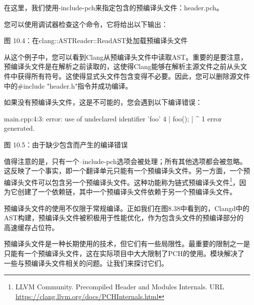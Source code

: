 在这里，我们使用-include-pch来指定包含的预编译头文件：header.pch。

您可以使用调试器检查这个命令，它将给出以下输出：


\begin{center}
图 10.4：在clang::ASTReader::ReadAST处加载预编译头文件
\end{center}

从这个例子中，您可以看到Clang从预编译头文件中读取AST。重要的是要注意，预编译头文件是在解析之前读取的，这使得Clang能够在解析主源文件之前从头文件中获得所有符号。这使得显式头文件包含变得不必要。因此，您可以删除源文件中的\#include "header.h"指令并成功编译。

如果没有预编译头文件，这是不可能的，您会遇到以下编译错误：

\begin{shell}
main.cpp:4:3: error: use of undeclared identifier 'foo'
   4 |   foo();
     |   ^
1  error generated.
\end{shell}

\begin{center}
图 10.5：由于缺少包含而产生的编译错误
\end{center}

值得注意的是，只有一个–include-pch选项会被处理；所有其他选项都会被忽略。这反映了一个事实，即一个翻译单元只能有一个预编译头文件。另一方面，一个预编译头文件可以包含另一个预编译头文件。这种功能称为链式预编译头文件\footnote{LLVM Community. Precompiled Header and Modules Internals. URL \url{https://clang.llvm.org/docs/PCHInternals.html}}，因为它创建了一个依赖链，其中一个预编译头文件依赖于另一个预编译头文件。

预编译头文件的使用不仅限于常规编译。正如我们在图8.38中看到的，Clangd中的AST构建，预编译头文件被积极用于性能优化，作为包含头文件的预编译部分的高速缓存占位符。

预编译头文件是一种长期使用的技术，但它们有一些局限性。最重要的限制之一是只能有一个预编译头文件，这在实际项目中大大限制了PCH的使用。模块解决了一些与预编译头文件相关的问题。让我们来探讨它们。
